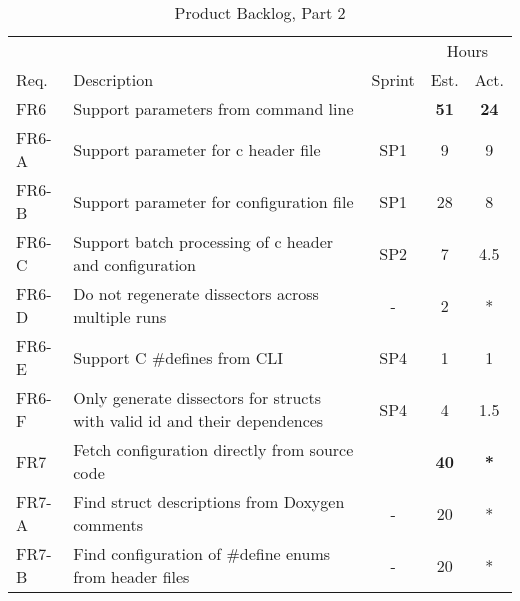 \begin{table}[htbp] \small \center
\caption{Product Backlog, Part 2 \label{tab:prodbacklog2}}
\begin{tabularx}{\textwidth}{l X c c c}
	\toprule
	& & & \multicolumn{2}{c}{Hours} \\
	\cmidrule(r){4-5}
	Req. & Description & Sprint & Est. & Act. \\
	\midrule	
	FR6 & Support parameters from command line & & \textbf{51} & \textbf{24}\\
	FR6-A & Support parameter for \Gls{c} \gls{header} file & SP1 & 9 & 9 \\
	FR6-B & Support parameter for configuration file & SP1 & 28 & 8 \\
	FR6-C & Support batch processing of \Gls{c} \gls{header} and configuration & SP2 & 7 & 4.5 \\
	FR6-D & Do not regenerate dissectors across multiple runs & - & 2 & *\\
	FR6-E & Support C \#defines from CLI & SP4 & 1 & 1 \\
	FR6-F & Only generate dissectors for structs with valid id and their dependences & SP4 & 4 & 1.5\\
    \addlinespace
	FR7 & Fetch configuration directly from source code & & \textbf{40} &  \textbf{*} \\
	FR7-A & Find struct descriptions from Doxygen comments & - & 20 & *\\
	FR7-B & Find configuration of \#define enums from header files & - & 20 & * \\
	\bottomrule
\end{tabularx}
\end{table}

